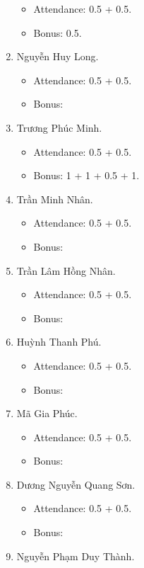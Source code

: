 \documentclass{article}
\begin{document}
\begin{enumerate}
    \begin{itemize}
        \item Attendance: 0.5 + 0.5.
        \item Bonus: 0.5.
    \end{itemize}
    \item {\sc Nguyễn Huy Long.}
    \begin{itemize}
        \item Attendance: 0.5 + 0.5.
        \item Bonus:
    \end{itemize}
    \item {\sc Trương Phúc Minh.}
    \begin{itemize}
        \item Attendance: 0.5 + 0.5.
        \item Bonus: 1 + 1 + 0.5 + 1.
    \end{itemize}
    \item {\sc Trần Minh Nhân.}
    \begin{itemize}
        \item Attendance: 0.5 + 0.5.
        \item Bonus:
    \end{itemize}
    \item {\sc Trần Lâm Hồng Nhân.}
    \begin{itemize}
        \item Attendance: 0.5 + 0.5.
        \item Bonus:
    \end{itemize}
    \item {\sc Huỳnh Thanh Phú.}
    \begin{itemize}
        \item Attendance: 0.5 + 0.5.
        \item Bonus:
    \end{itemize}
    \item {\sc Mã Gia Phúc.}
    \begin{itemize}
        \item Attendance: 0.5 + 0.5.
        \item Bonus:
    \end{itemize}
    \item {\sc Dương Nguyễn Quang Sơn.}
    \begin{itemize}
        \item Attendance: 0.5 + 0.5.
        \item Bonus:
    \end{itemize}
    \item {\sc Nguyễn Phạm Duy Thành.}

\end{enumerate}
\end{document}
